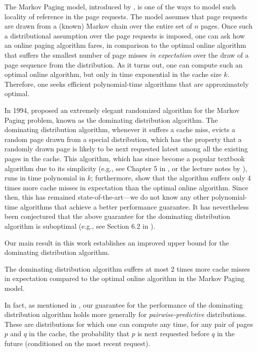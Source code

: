 The Markov Paging model, introduced by \cite{karlin1992markov}, is one of the ways to model such locality of reference in the page requests. The model assumes that page requests are drawn from a (known) Markov chain over the entire set of $n$ pages. Once such a distributional assumption over the page requests is imposed, one can ask how an online paging algorithm fares, in comparison to the optimal online algorithm that suffers the smallest number of page misses \textit{in expectation} over the draw of a page sequence from the distribution. As it turns out, one can compute such an optimal online algorithm, but only in time exponential in the cache size $k$. Therefore, one seeks efficient polynomial-time algorithms that are approximately optimal.

In 1994, \cite{lund1994ip} proposed an extremely elegant randomized algorithm for the Markov Paging problem, known as the dominating distribution algorithm. The dominating distribution algorithm, whenever it suffers a cache miss, evicts a random page drawn from a special distribution, which has the property that a randomly drawn page is likely to be next requested latest among all the existing pages in the cache. This algorithm, which has since become a popular textbook algorithm due to its simplicity (e.g., see Chapter 5 in \cite{borodin2005online}, or the lecture notes by \cite{roughgardennotes}), runs in time polynomial in $k$; furthermore, \cite{lund1994ip} show that the algorithm suffers only 4 times more cache misses in expectation than the optimal online algorithm. Since then, this has remained state-of-the-art---we do not know any other polynomial-time algorithms that achieve a better performance guarantee. It has nevertheless been conjectured that the above guarantee for the dominating distribution algorithm is suboptimal (e.g., see Section 6.2 in \cite{roughgardennotes}).


Our main result in this work establishes an improved upper bound for the dominating distribution algorithm.

\begin{theorem}
    \label{thm:dominating-distribution-improved-bound}
    The dominating distribution algorithm suffers at most 2 times more cache misses in expectation compared to the optimal online algorithm in the Markov Paging model.%
\end{theorem}
In fact, as mentioned in \cite{lund1994ip}, our guarantee for the performance of the dominating distribution algorithm holds more generally for \textit{pairwise-predictive} distributions. These are distributions for which one can compute any time, for any pair of pages $p$ and $q$ in the cache, the probability that $p$ is next requested before $q$ in the future (conditioned on the most recent request).

